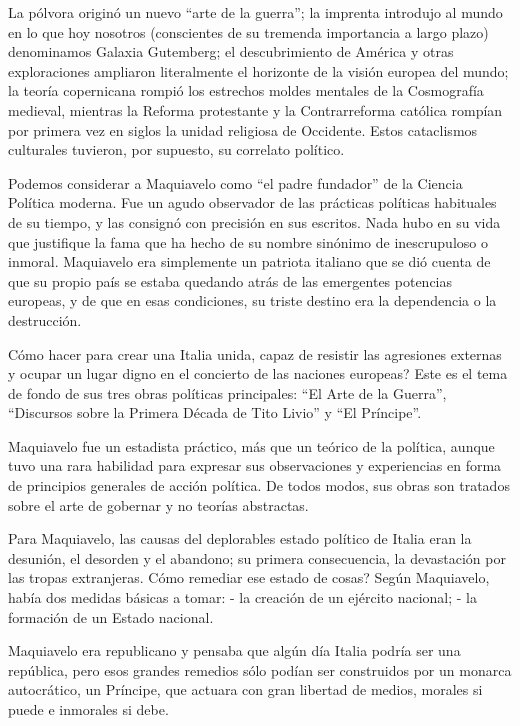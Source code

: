 \documentclass[
]{book}
\begin{document}
La pólvora originó un nuevo ``arte de la guerra''; la imprenta introdujo al mundo en lo que hoy nosotros (conscientes de su tremenda importancia a largo plazo) denominamos Galaxia Gutemberg; el descubrimiento de América y otras exploraciones ampliaron literalmente el horizonte de la visión europea del mundo; la teoría copernicana rompió los estrechos moldes mentales de la Cosmografía medieval, mientras la Reforma protestante y la Contrarreforma católica rompían por primera vez en siglos la unidad religiosa de Occidente. Estos cataclismos culturales tuvieron, por supuesto, su correlato político.

Podemos considerar a Maquiavelo como ``el padre fundador'' de la Ciencia Política moderna. Fue un agudo observador de las prácticas políticas habituales de su tiempo, y las consignó con precisión en sus escritos. Nada hubo en su vida que justifique la fama que ha hecho de su nombre sinónimo de inescrupuloso o inmoral. Maquiavelo era simplemente un patriota italiano que se dió cuenta de que su propio país se estaba quedando atrás de las emergentes potencias europeas, y de que en esas condiciones, su triste destino era la dependencia o la destrucción.

Cómo hacer para crear una Italia unida, capaz de resistir las agresiones externas y ocupar un lugar digno en el concierto de las naciones europeas? Este es el tema de fondo de sus tres obras políticas principales: ``El Arte de la Guerra'', ``Discursos sobre la Primera Década de Tito Livio'' y ``El Príncipe''.

Maquiavelo fue un estadista práctico, más que un teórico de la política, aunque tuvo una rara habilidad para expresar sus observaciones y experiencias en forma de principios generales de acción política. De todos modos, sus obras son tratados sobre el arte de gobernar y no teorías abstractas.

Para Maquiavelo, las causas del deplorables estado político de Italia eran la desunión, el desorden y el abandono; su primera consecuencia, la devastación por las tropas extranjeras. Cómo remediar ese estado de cosas? Según Maquiavelo, había dos medidas básicas a tomar: - la creación de un ejército nacional; - la formación de un Estado nacional.

Maquiavelo era republicano y pensaba que algún día Italia podría ser una república, pero esos grandes remedios sólo podían ser construidos por un monarca autocrático, un Príncipe, que actuara con gran libertad de medios, morales si puede e inmorales si debe.
\end{document}
